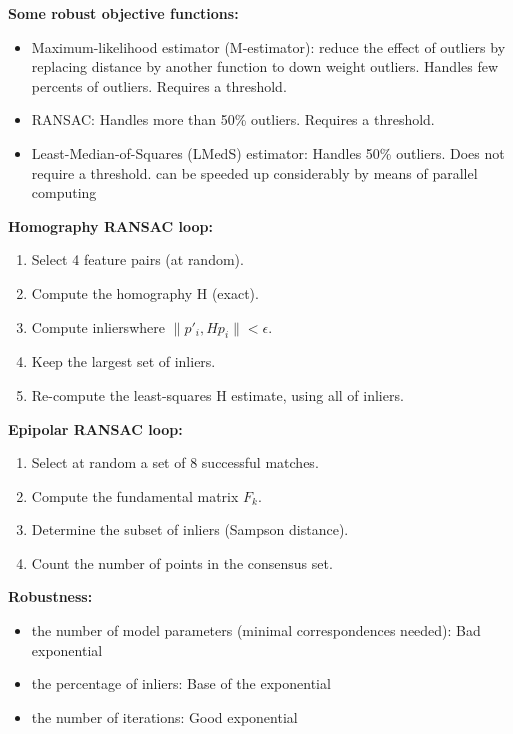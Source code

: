 \documentclass{../cheat}
\begin{document}
\begin{multicols}{3}
	\textbf{Some robust objective functions:}
	\begin{itemize}[nolistsep, leftmargin=1em]
		\item Maximum-likelihood estimator (M-estimator): reduce the effect of outliers by replacing distance by another function to down weight outliers.
			 Handles few percents of outliers.
			 Requires a threshold.
		\item RANSAC: 
			 Handles more than 50\% outliers.
			 Requires a threshold.
		\item Least-Median-of-Squares (LMedS) estimator:
			Handles 50\% outliers.
			 Does not require a threshold.
			 can be speeded up considerably by means of parallel computing
	\end{itemize}
	
	\textbf{Homography RANSAC loop:}
	\begin{enumerate}[nolistsep, leftmargin=1em]
		\item Select 4 feature pairs (at random).
		\item Compute the homography H (exact).
		\item Compute inlierswhere $\parallel p'_i, Hp_i\parallel< \epsilon$.
		\item Keep the largest set of inliers.
		\item Re-compute the least-squares H estimate, using all of inliers.	
	\end{enumerate}
	
	\textbf{Epipolar RANSAC loop:}
	\begin{enumerate}[nolistsep, leftmargin=1em]
		\item Select at random a set of 8 successful matches.
		\item Compute the fundamental matrix $F_k$.
		\item Determine the subset of inliers (Sampson distance).
		\item Count the number of points in the consensus set.
	\end{enumerate}
	
	\textbf{Robustness:}
	\begin{itemize}[nolistsep, leftmargin=1em]	
		\item the number of model parameters (minimal correspondences needed): Bad exponential
		\item the percentage of inliers: Base of the exponential
		\item the number of iterations: Good exponential
	\end{itemize}


\end{multicols}
\end{document}
